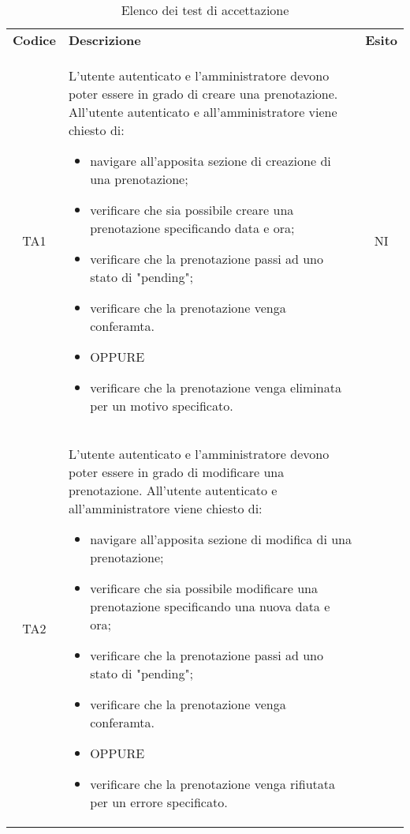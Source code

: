 {
    \renewcommand{\arraystretch}{1.5}
    \centering
    \begin{longtable}{ c C{11cm} c }
        \caption{Elenco dei test di accettazione}\\
        \rowcolor{\primaryColor}
        \textcolor{\secondaryColor}{
        \textbf{Codice}}     & \textcolor{\secondaryColor}
        {\textbf{Descrizione}} & \textcolor{\secondaryColor}{\textbf{Esito}} \\

        TA1&
        L'utente autenticato e l'amministratore devono poter essere in grado di creare una prenotazione.\newline
        All'utente autenticato e all'amministratore viene chiesto di:
        \begin{itemize}
            \item navigare all'apposita sezione di creazione di una prenotazione;
            \item verificare che sia possibile creare una prenotazione specificando data e ora;
            \item verificare che la prenotazione passi ad uno stato di "pending";
            \item verificare che la prenotazione venga conferamta.
            \item [] OPPURE
            \item verificare che la prenotazione venga eliminata per un motivo specificato.
        \end{itemize}&
        NI\\
        TA2&
        L'utente autenticato e l'amministratore devono poter essere in grado di modificare una prenotazione.\newline
        All'utente autenticato e all'amministratore viene chiesto di:
        \begin{itemize}
            \item navigare all'apposita sezione di modifica di una prenotazione;
            \item verificare che sia possibile modificare una prenotazione specificando una nuova data e ora;
            \item verificare che la prenotazione passi ad uno stato di "pending";
            \item verificare che la prenotazione venga conferamta.
            \item [] OPPURE
            \item verificare che la prenotazione venga rifiutata per un errore specificato.

\end{itemize}
\end{longtable}}
